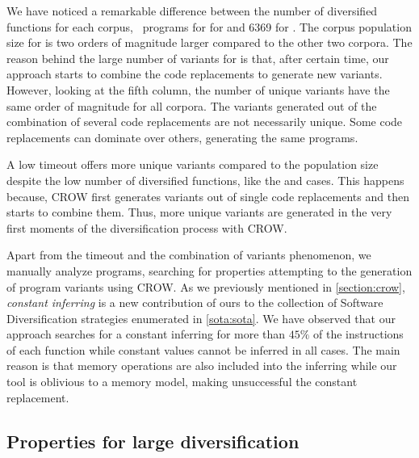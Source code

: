 We have noticed a remarkable difference between the number of diversified functions for each corpus, \rossetapopulation\ programs for  for \corpussodium and 6369 for \corpusqrcode. The corpus population size for \corpusrosetta is two orders of magnitude larger compared to the other two corpora. The reason behind the large number of variants for \corpusrosetta is that, after certain time, our approach starts to combine the code replacements to generate new variants. However, looking at the fifth column, the number of unique variants have the same order of magnitude for all corpora.
The variants generated out of the combination of several code replacements are not necessarily unique. Some code replacements can dominate over others, generating the same \wasm programs.

A low timeout offers more unique variants compared to the population size despite the low number of diversified functions, like the \corpussodium and \corpusqrcode cases. This happens because, CROW first generates variants out of single code replacements and then starts to combine them. Thus, more unique variants are generated in the very first moments of the diversification process with CROW.


Apart from the timeout and the combination of variants phenomenon, we manually analyze programs, searching for properties attempting to the generation of program variants using CROW.
As we previously mentioned in \autoref{section:crow}, \emph{constant inferring} is a new contribution of ours to the collection of Software Diversification strategies enumerated in \autoref{sota:sota}. 
We have observed that our approach searches for a constant inferring for more than $45\%$ of the instructions of each function while constant values cannot be inferred in all cases. The main reason is that memory operations are also included into the inferring while our tool is oblivious to a memory model, making unsuccessful the constant replacement.

\subsection{Properties for large diversification}

